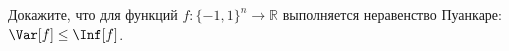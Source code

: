 Докажите, что для функций $f\colon \{-1, 1\}^n \to \mathbb{R}$ выполняется неравенство Пуанкаре:
$\Var[f] \le \Inf[f]$.
